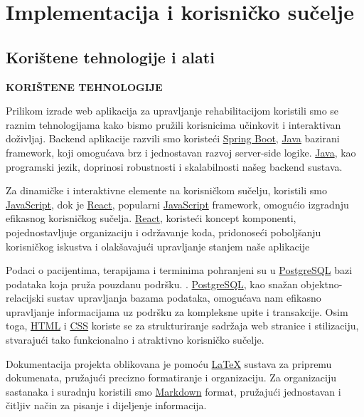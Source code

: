 \chapter{Implementacija i korisničko sučelje}
		
		
		\section{Korištene tehnologije i alati}
	
			
\textbf{	KORIŠTENE TEHNOLOGIJE
} 

Prilikom izrade web aplikacija za upravljanje rehabilitacijom koristili smo se raznim tehnologijama kako bismo pružili korisnicima učinkovit i interaktivan doživljaj. Backend aplikacije razvili smo koristeći \href{https://www.spring.io/projects/spring-boot}{Spring Boot}, \href{https://www.oracle.com/java}{Java} bazirani framework, koji omogućava brz i jednostavan razvoj server-side logike. \href{https://www.oracle.com/java}{Java}, kao programski jezik, doprinosi robustnosti i skalabilnosti našeg backend sustava.

Za dinamičke i interaktivne elemente na korisničkom sučelju, koristili smo \href{https://www.developer.mozilla.org/en-US/docs/Web/JavaScript}{JavaScript}, dok je \href{https://www.reactjs.org}{React}, popularni \href{https://www.developer.mozilla.org/en-US/docs/Web/JavaScript}{JavaScript} framework, omogućio izgradnju efikasnog korisničkog sučelja. \href{https://www.reactjs.org}{React}, koristeći koncept komponenti, pojednostavljuje organizaciju i održavanje koda, pridonoseći poboljšanju korisničkog iskustva i olakšavajući upravljanje stanjem naše aplikacije 

Podaci o pacijentima, terapijama i terminima pohranjeni su u \href{https://www.postgresql.org}{PostgreSQL} bazi podataka koja pruža pouzdanu podršku. . \href{https://www.postgresql.org}{PostgreSQL}, kao snažan objektno-relacijski sustav upravljanja bazama podataka, omogućava nam efikasno upravljanje informacijama uz podršku za kompleksne upite i transakcije. Osim toga, \href{https://www.developer.mozilla.org/en-US/docs/Web/HTML}{HTML} i \href{https://www.developer.mozilla.org/en-US/docs/Web/CSS}{CSS} koriste se za strukturiranje sadržaja web stranice i stilizaciju, stvarajući tako funkcionalno i atraktivno korisničko sučelje.

Dokumentacija projekta oblikovana je pomoću \href{https://www.overleaf.com/learn/latex/Learn_LaTeX_in_30_minutes}{LaTeX} sustava za pripremu dokumenata, pružajući precizno formatiranje i organizaciju. Za organizaciju sastanaka i suradnju koristili smo \href{https://www.markdownguide.org}{Markdown} format, pružajući jednostavan i čitljiv način za pisanje i dijeljenje informacija.

